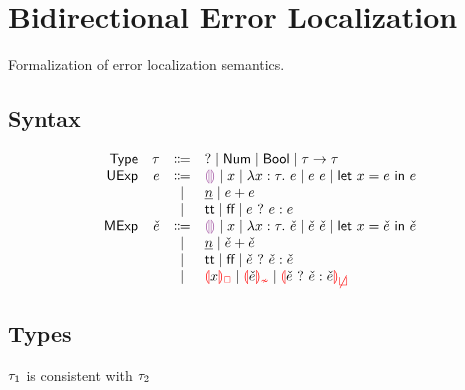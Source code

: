 \documentclass{article}
\begin{document}
\renewcommand{\thesection}{\Alph{section}}
\section{Bidirectional Error Localization}
Formalization of error localization semantics.

\subsection{Syntax}
\[\begin{array}{rrcl}
  \TMName  & \TMV  & \Coloneqq & \TUnknown \mid \TNum \mid \TBool \mid \TArrow{\TMV}{\TMV} \\
  \EMName  & \EMV  & \Coloneqq & \EEHole \mid x \mid \ELam{x}{\TMV}{\EMV} \mid \EAp{\EMV}{\EMV} \mid \ELet{x}{\EMV}{\EMV} \\
           &       & \mid         & \ENumMV \mid \EPlus{\EMV}{\EMV} \\
           &       & \mid         & \ETrue \mid \EFalse \mid \EIf{\EMV}{\EMV}{\EMV} \\
  \ECMName & \ECMV & \Coloneqq & \ECEHole \mid x \mid \ECLam{x}{\TMV}{\ECMV} \mid \ECAp{\ECMV}{\ECMV} \mid \ECLet{x}{\ECMV}{\ECMV} \\
           &       & \mid         & \ECNumMV \mid \ECPlus{\ECMV}{\ECMV} \\
           &       & \mid         & \ECTrue \mid \ECFalse \mid \ECIf{\ECMV}{\ECMV}{\ECMV} \\
           &       & \mid         & \ECUnbound{x} \mid \ECInconType{\ECMV} \mid \ECInconBr{\ECMV}{\ECMV}{\ECMV} \\
\end{array}\]

\subsection{Types}
 $\TMV_1$ is consistent with $\TMV_2$
%
\begin{mathpar}



\end{mathpar} \\
\end{document}
